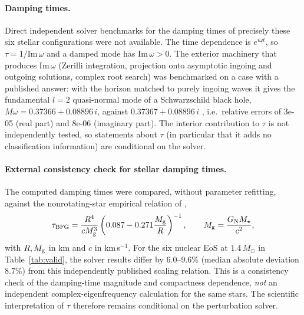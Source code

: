 \documentclass[11pt,a4paper]{article}
\newcommand{\Msun}{M_\odot}
\begin{document}
\paragraph{Damping times.} Direct independent solver benchmarks for the damping times of precisely these six stellar configurations were not available. The time dependence is $e^{i\omega t}$, so $\tau=1/\mathrm{Im}\,\omega$ and a damped mode has $\mathrm{Im}\,\omega>0$. The exterior machinery that produces $\mathrm{Im}\,\omega$ (Zerilli integration, projection onto asymptotic ingoing and outgoing solutions, complex root search) was benchmarked on a case with a published answer: with the horizon matched to purely ingoing waves it gives the fundamental $l=2$ quasi-normal mode of a Schwarzschild black hole, $M\omega=0.37366+0.08896\,i$, against $0.37367+0.08896\,i$ \citep{Leaver85}, i.e.\ relative errors of 3e-05 (real part) and 8e-06 (imaginary part). The interior contribution to $\tau$ is not independently tested, so statements about $\tau$ (in particular that it adds no classification information) are conditional on the solver.
\paragraph{External consistency check for stellar damping times.}
The computed damping times were compared, without parameter refitting, against the nonrotating-star empirical relation of \citet{Benhar04},
\begin{equation}
\tau_{\rm BFG}=\frac{R^4}{cM_{\rm g}^3}
\left(0.087-0.271\frac{M_{\rm g}}{R}\right)^{-1},
\qquad M_{\rm g}=\frac{G_{\rm N}M_\star}{c^2},
\end{equation}
with $R,M_{\rm g}$ in km and $c$ in km\,s$^{-1}$. For the six nuclear EoS at $1.4\,\Msun$ in Table~\ref{tab:valid}, the solver results differ by 6.0--9.6\% (median absolute deviation 8.7\%) from this independently published scaling relation. This is a consistency check of the damping-time magnitude and compactness dependence, \emph{not} an independent complex-eigenfrequency calculation for the same stars. The scientific interpretation of $\tau$ therefore remains conditional on the perturbation solver.
\end{document}
